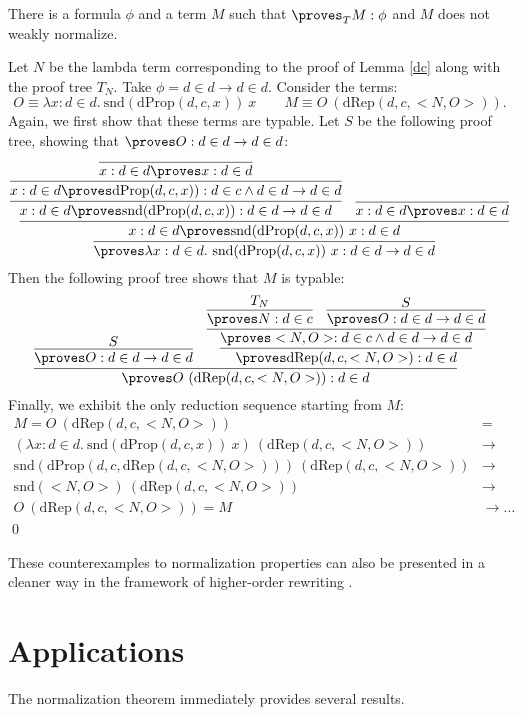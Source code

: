 \documentclass{LMCS}
\newcommand{\p}{\proves}
\newcommand{\pl}[1]{\ensuremath{\mathrm{#1}}}
\newcommand{\SND}{\pl{snd}}
\begin{document}
\begin{thm}\label{notweakly}
There is a formula $\phi$ and a term $M$ such that $\p_T M : \phi$ and $M$
does not weakly normalize.
\end{thm}
\proof Let $N$ be the lambda term corresponding to the proof of Lemma \ref{dc} along
with the proof tree $T_N$. Take $\phi = d \in d \to d \in d$. Consider the terms:
\[
O \equiv \lambda x : d \in d.\ \SND(\pl{dProp}(d, c, x))\ x
\qquad 
M \equiv O\ (\pl{dRep}(d, c, <N, O>)).
\]
Again, we first show that these terms are typable. Let $S$ be the following proof
tree, showing that $\p O : d \in d \to d \in d$:
\[
\infer{\p \lambda x : d \in d.\ \SND(\pl{dProp}(d, c, x))\ x : d \in d \to d
\in d}
{
  \infer{x : d \in d \p \SND(\pl{dProp}(d, c, x))\ x : d \in d}
  {
    \infer{x : d \in d \p \SND(\pl{dProp}(d, c, x)) : d \in d \to d \in d}
    {
      \infer{x : d \in d \p \pl{dProp}(d, c, x)) : d \in c \land d \in d \to
d \in d}
      {
        \infer{x : d \in d \p x : d \in d}{}
      }
    }
    &
    \infer{x : d \in d \p x : d \in d}{}
  }
}
\]
Then the following proof tree shows that $M$ is typable:
\[
\infer{\p O\ (\pl{dRep}(d, c, <N, O>)) : d \in d}
{
  \infer{\p O : d \in d \to d \in d}{S}
  &
  \infer{\p \pl{dRep}(d, c, <N, O>) : d \in d}
  {
    \infer{\p <N, O> : d \in c \land d \in d \to d \in d}
    {
      \infer{\p N : d \in c}{T_N}
      &
      \infer{\p O : d \in d \to d \in d}{S}
    }
  }
}
\]
Finally, we exhibit the only reduction sequence starting from $M$:
\[
\begin{array}{ll}
M = O\ (\pl{dRep}(d, c, <N, O>)) & = \\
(\lambda x : d \in d.\ \SND(\pl{dProp}(d, c, x))\ x)\ (\pl{dRep}(d, c, <N,
O>)) & \to\\
\SND(\pl{dProp}(d, c, \pl{dRep}(d, c, <N,
O>)))\ (\pl{dRep}(d, c, <N, O>)) & \to\\
\SND(<N, O>)\ (\pl{dRep}(d, c, <N, O>)) & \to\\
O\ (\pl{dRep}(d, c, <N, O>)) = M & \to {\ldots} 
\end{array}
\]\qed


These counterexamples to normalization properties can also be presented in a
cleaner way in the framework of higher-order rewriting \cite{jawst2006}. 

\section{Applications}\label{secapp}

The normalization theorem immediately provides several results. 
\end{document}
